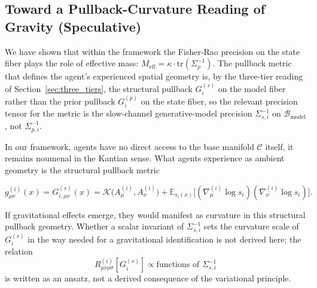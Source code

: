 \documentclass[11pt]{article}
\begin{document}
\subsection{Toward a Pullback-Curvature Reading of Gravity (Speculative)}
\label{sec:gravity_pullback}

We have shown that within the framework the Fisher-Rao precision on the state fiber plays the role of effective mass: $M_{\text{eff}} = \kappa \cdot \mathrm{tr}(\Sigma_p^{-1})$. The pullback metric that defines the agent's experienced spatial geometry is, by the three-tier reading of Section~\ref{sec:three_tiers}, the structural pullback $G_i^{(s)}$ on the model fiber rather than the prior pullback $G_i^{(p)}$ on the state fiber, so the relevant precision tensor for the metric is the slow-channel generative-model precision $\Sigma_{s,i}^{-1}$ on $\mathcal{B}_{\mathrm{model}}$, not $\Sigma_{p,i}^{-1}$.

In our framework, agents have no direct access to the base manifold $\mathcal{C}$ itself, it remains noumenal in the Kantian sense. What agents experience as ambient geometry is the structural pullback metric

\begin{equation}
g_{\mu\nu}^{(i)}(x) = G^{(s)}_{i,\mu\nu}(x) = \mathcal{K}\big(A^{(i)}_\mu, A^{(i)}_\nu\big) + \mathbb{E}_{s_i(x)}\big[(\nabla^{(i)}_\mu \log s_i)(\nabla^{(i)}_\nu \log s_i)\big].
\end{equation}

If gravitational effects emerge, they would manifest as curvature in this structural pullback geometry. Whether a scalar invariant of $\Sigma_{s,i}^{-1}$ sets the curvature scale of $G^{(s)}_i$ in the way needed for a gravitational identification is not derived here; the relation
\begin{equation}
R_{\mu\nu\rho\sigma}^{(i)}[G^{(s)}_i] \propto \text{functions of } \Sigma_{s,i}^{-1}
\end{equation}
is written as an ansatz, not a derived consequence of the variational principle.
\end{document}
